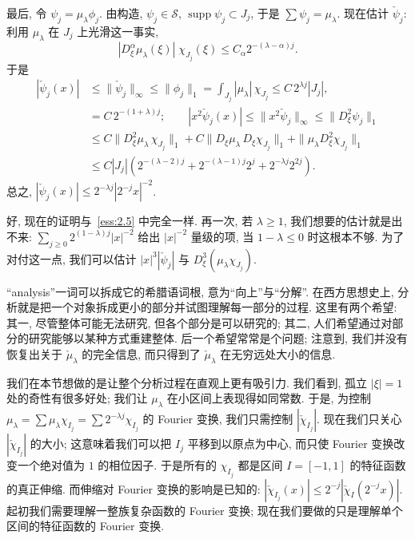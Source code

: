 最后, 令 $\psi_j=\mu_\lambda\phi_j$. 由构造, $\psi_j\in\mathcal{S}$, $\operatorname{supp}\psi_j\subset J_j$, 于是 $\sum\psi_j=\mu_\lambda$. 现在估计 $\check{\psi}_j$: 利用 $\mu_\lambda$ 在 $J_j$ 上光滑这一事实,
\[
|D_{\xi}^{\alpha}\mu_{\lambda}(\xi)|\;\chi_{J_{j}}(\xi)\leq C_{\alpha}2^{-(\lambda-\alpha)j}.
\]
于是
\begin{align*}
|\check{\psi}_{j}(x)|&\leq\|\check{\psi}_{j}\|_{\infty}\leq\|\phi_{j}\|_{1}
=\int_{J_{j}}|\mu_{\lambda}|\,\chi_{J_{j}}\leq C\,2^{\lambda j}|J_{j}|, \\
&=C\,2^{-(1+\lambda)j};\qquad
|x^{2}\check{\psi}_{j}(x)|\leq\|x^{2}\check{\psi}_{j}\|_{\infty}\leq\|D_{\xi}^{2}\psi_{j}\|_{1} \\
&\leq C\|D_{\xi}^{2}\mu_{\lambda}\,\chi_{J_{j}}\|_{1}
+C\|D_{\xi}\mu_{\lambda}\,D_{\xi}\chi_{J_{j}}\|_{1}
+\|\mu_{\lambda}D_{\xi}^{2}\chi_{J_{j}}\|_{1} \\
&\leq C|J_{j}|\left(2^{-(\lambda-2)j}+2^{-(\lambda-1)j}2^{j}+2^{-\lambda j}2^{2j}\right).
\end{align*}
总之, $|\check{\psi}_{j}(x)|\leq 2^{-\lambda j}|2^{-j}x|^{-2}$.

好, 现在的证明与~\ref*{ess:2.5} 中完全一样. 再一次, 若 $\lambda\geq 1$, 我们想要的估计就是出不来: $\sum_{j\geq 0}2^{(1-\lambda)j}|x|^{-2}$ 给出 $|x|^{-2}$ 量级的项, 当 $1-\lambda\leq 0$ 时这根本不够. 为了对付这一点, 我们可以估计 $|x|^3|\check{\psi}_j|$ 与 $D_{\xi}^{3}(\mu_{\lambda}\chi_{J_j})$.


``analysis''一词可以拆成它的希腊语词根, 意为``向上''与``分解''. 在西方思想史上, 分析就是把一个对象拆成更小的部分并试图理解每一部分的过程. 这里有两个希望: 其一, 尽管整体可能无法研究, 但各个部分是可以研究的; 其二, 人们希望通过对部分的研究能够以某种方式重建整体. 后一个希望常常是个问题; 注意到, 我们并没有恢复出关于 $\check{\mu}_{\lambda}$ 的完全信息, 而只得到了 $\check{\mu}_{\lambda}$ 在无穷远处大小的信息.

我们在本节想做的是让整个分析过程在直观上更有吸引力. 我们看到, 孤立 $|\xi|=1$ 处的奇性有很多好处; 我们让 $\mu_\lambda$ 在小区间上表现得如同常数. 于是, 为控制 $\mu_\lambda=\sum\mu_\lambda\chi_{I_j}=\sum 2^{-\lambda j}\chi_{I_j}$ 的 Fourier 变换, 我们只需控制 $|\check{\chi}_{I_j}|$. 现在我们只关心 $|\check{\chi}_{I_j}|$ 的大小; 这意味着我们可以把 $I_j$ 平移到以原点为中心, 而只使 Fourier 变换改变一个绝对值为 $1$ 的相位因子. 于是所有的 $\chi_{I_j}$ 都是区间 $I=[-1,1]$ 的特征函数的真正伸缩. 而伸缩对 Fourier 变换的影响是已知的: $|\check{\chi}_{I_j}(x)|\leq 2^{-j}|\check{\chi}_{I}(2^{-j}x)|$. 起初我们需要理解一整族复杂函数的 Fourier 变换; 现在我们要做的只是理解单个区间的特征函数的 Fourier 变换.

